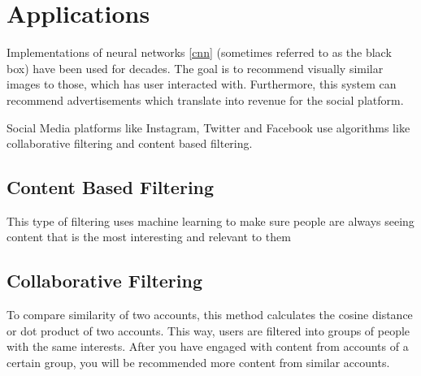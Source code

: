 \section{Applications} \label{applications}

Implementations of neural networks \ref{cnn} (sometimes referred to as the black box) have been used for decades. The goal is to recommend visually similar images to those, which has user interacted with. Furthermore, this system can recommend advertisements which translate into revenue for the social platform. 

Social Media platforms like Instagram, Twitter and Facebook use algorithms like collaborative filtering and content based filtering. \cite{10142790} 

\subsection{Content Based Filtering}\label{applications/content-based-filtering}

This type of filtering uses machine learning to make sure people are always seeing content that is the most interesting and relevant to them \cite{ig-new-content}


\subsection{Collaborative Filtering}\label{applications/collaborative-filtering}

To compare similarity of two accounts, this method calculates the cosine distance or dot product of two accounts. \cite{ig-explore} This way, users are filtered into groups of people with the same interests. After you have engaged with content from accounts of a certain group, you will be recommended more content from similar accounts. 